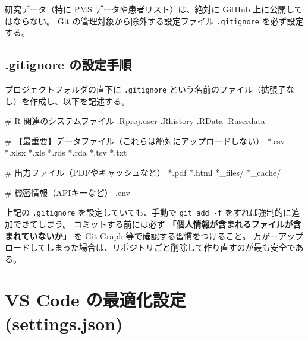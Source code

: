 \documentclass[
  pandoc]{bxjsarticle}
\newenvironment{Shaded}{\begin{snugshade}}{\end{snugshade}}
\newcommand{\NormalTok}[1]{\textcolor[rgb]{0.00,0.23,0.31}{#1}}
\begin{document}
研究データ（特に PMS データや患者リスト）は、絶対に GitHub
上に公開してはならない。 Git の管理対象から除外する設定ファイル
\texttt{.gitignore} を必ず設定する。

\subsection{.gitignore
の設定手順}\label{gitignore-ux306eux8a2dux5b9aux624bux9806}

プロジェクトフォルダの直下に \texttt{.gitignore}
という名前のファイル（拡張子なし）を作成し、以下を記述する。

\begin{Shaded}
\begin{Highlighting}[]
\NormalTok{\# R 関連のシステムファイル}
\NormalTok{.Rproj.user}
\NormalTok{.Rhistory}
\NormalTok{.RData}
\NormalTok{.Ruserdata}

\NormalTok{\# 【最重要】データファイル（これらは絶対にアップロードしない）}
\NormalTok{*.csv}
\NormalTok{*.xlsx}
\NormalTok{*.xls}
\NormalTok{*.rds}
\NormalTok{*.rda}
\NormalTok{*.tsv}
\NormalTok{*.txt}

\NormalTok{\# 出力ファイル（PDFやキャッシュなど）}
\NormalTok{*.pdf}
\NormalTok{*.html}
\NormalTok{*\_files/}
\NormalTok{*\_cache/}

\NormalTok{\# 機密情報（APIキーなど）}
\NormalTok{.env}
\end{Highlighting}
\end{Shaded}

\begin{tcolorbox}[enhanced jigsaw, colframe=quarto-callout-warning-color-frame, toprule=.15mm, rightrule=.15mm, colback=white, opacitybacktitle=0.6, toptitle=1mm, left=2mm, opacityback=0, coltitle=black, arc=.35mm, breakable, bottomrule=.15mm, bottomtitle=1mm, titlerule=0mm, title=\textcolor{quarto-callout-warning-color}{\faExclamationTriangle}\hspace{0.5em}{セキュリティ警告}, leftrule=.75mm, colbacktitle=quarto-callout-warning-color!10!white]

上記の \texttt{.gitignore} を設定していても、手動で
\texttt{git\ add\ -f} をすれば強制的に追加できてしまう。
コミットする前には必ず
\textbf{「個人情報が含まれるファイルが含まれていないか」} を Git Graph
等で確認する習慣をつけること。
万が一アップロードしてしまった場合は、リポジトリごと削除して作り直すのが最も安全である。

\end{tcolorbox}

\section{VS Code の最適化設定
(settings.json)}\label{vs-code-ux306eux6700ux9069ux5316ux8a2dux5b9a-settings.json}
\end{document}
